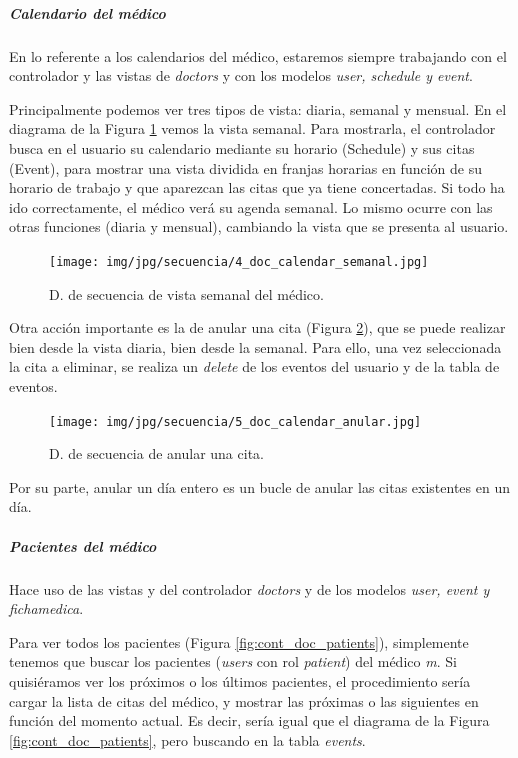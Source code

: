 \documentclass[a4paper,oneside,11pt]{book}
\begin{document}
				\subparagraph{Calendario del médico} %
				\label{subp:cont_calendario}
				
					En lo referente a los calendarios del médico, estaremos siempre trabajando con el controlador y las vistas de \textit{doctors} y con los modelos \textit{user, schedule y event}.
					
					Principalmente podemos ver tres tipos de vista: diaria, semanal y mensual. En el diagrama de la Figura \ref{fig:cont_doc_calendar} vemos la vista semanal. Para mostrarla, el controlador busca en el usuario su calendario mediante su horario (Schedule) y sus citas (Event), para mostrar una vista dividida en franjas horarias en función de su horario de trabajo y que aparezcan las citas que ya tiene concertadas. Si todo ha ido correctamente, el médico verá su agenda semanal. Lo mismo ocurre con las otras funciones (diaria y mensual), cambiando la vista que se presenta al usuario.
					
					\begin{figure}[H]
					  \centering
					    \texttt{[image: img/jpg/secuencia/4\_doc\_calendar\_semanal.jpg]}
					  \caption{D. de secuencia de vista semanal del médico.}
					  \label{fig:cont_doc_calendar}
					\end{figure}
					
					Otra acción importante es la de anular una cita (Figura \ref{fig:cont_doc_calendar_anular}), que se puede realizar bien desde la vista diaria, bien desde la semanal. Para ello, una vez seleccionada la cita a eliminar, se realiza un \textit{delete} de los eventos del usuario y de la tabla de eventos.
					
					\begin{figure}[H]
					  \centering
					    \texttt{[image: img/jpg/secuencia/5\_doc\_calendar\_anular.jpg]}
					  \caption{D. de secuencia de anular una cita.}
					  \label{fig:cont_doc_calendar_anular}
					\end{figure}
					
					Por su parte, anular un día entero es un bucle de anular las citas existentes en un día.
					
					
			
				\subparagraph{Pacientes del médico} %
				\label{subp:cont_pacientes_del_medico}
				
					Hace uso de las vistas y del controlador \textit{doctors} y de los modelos \textit{user, event y fichamedica}.
					
					Para ver todos los pacientes (Figura \ref{fig:cont_doc_patients}), simplemente tenemos que buscar los pacientes (\textit{users} con rol \textit{patient}) del médico \textit{m}. Si quisiéramos ver los próximos o los últimos pacientes, el procedimiento sería cargar la lista de citas del médico, y mostrar las próximas o las siguientes en función del momento actual. Es decir, sería igual que el diagrama de la Figura \ref{fig:cont_doc_patients}, pero buscando en la tabla \textit{events}.
					
\end{document}
